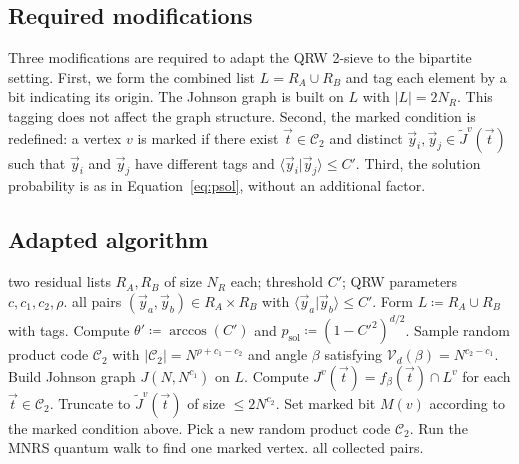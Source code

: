 \documentclass[10pt,a4paper]{article}
\begin{document}
\subsection{Required modifications}

Three modifications are required to adapt the QRW 2-sieve to the bipartite setting. First, we form the combined list \(L = R_A \cup R_B\) and tag each element by a bit indicating its origin. The Johnson graph is built on \(L\) with \(|L| = 2N_R\). This tagging does not affect the graph structure. Second, the marked condition is redefined: a vertex \(v\) is marked if there exist \(\vec{t} \in \mathcal{C}_2\) and distinct \(\vec{y}_i,\vec{y}_j \in \tilde{J}^v(\vec{t})\) such that \(\vec{y}_i\) and \(\vec{y}_j\) have different tags and \(\langle \vec{y}_i|\vec{y}_j\rangle \le C'\). Third, the solution probability is as in Equation~\eqref{eq:psol}, without an additional factor.

\subsection{Adapted algorithm}

\begin{algorithm}[H]
\caption{Adapted QRW 2-Sieve for bipartite configuration problems}
\label{alg:qrw}
\begin{algorithmic}[1]
\Require two residual lists \(R_A, R_B\) of size \(N_R\) each; threshold \(C'\); QRW parameters \(c, c_1, c_2, \rho\).
\Ensure all pairs \((\vec{y}_a, \vec{y}_b) \in R_A \times R_B\) with \(\langle \vec{y}_a|\vec{y}_b\rangle \le C'\).
\State Form \(L \coloneqq R_A \cup R_B\) with tags.
\State Compute \(\theta' \coloneqq \arccos(C')\) and \(p_{\mathrm{sol}} \coloneqq (1-C'^2)^{d/2}\).
\State Sample random product code \(\mathcal{C}_2\) with \(|\mathcal{C}_2| = N^{\rho+c_1-c_2}\) and angle \(\beta\) satisfying \(\mathcal{V}_d(\beta) = N^{c_2-c_1}\).
\State Build Johnson graph \(J(N, N^{c_1})\) on \(L\).
    \State Compute \(J^v(\vec{t}) = f_\beta(\vec{t}) \cap L^v\) for each \(\vec{t}\in\mathcal{C}_2\).
    \State Truncate to \(\tilde{J}^v(\vec{t})\) of size \(\le 2N^{c_2}\).
    \State Set marked bit \(M(v)\) according to the marked condition above.
\EndFor
{}
    \State Pick a new random product code \(\mathcal{C}_2\).
        \State Run the MNRS quantum walk to find one marked vertex.
    \EndWhile
\EndWhile
\State \Return all collected pairs.
\end{algorithmic}
\end{algorithm}
\end{document}
